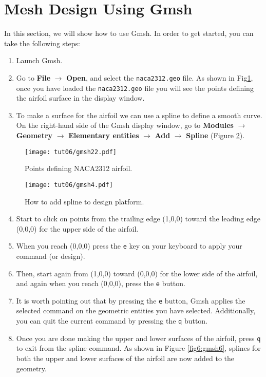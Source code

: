 \section{Mesh Design Using Gmsh}
In this section, we will show how to use Gmsh. In order to get started, you can take the following steps:
\begin{enumerate}[label=\arabic*)]
	\setcounter{enumi}{0}
	\item Launch Gmsh.
	\item Go to \textbf{File} $\rightarrow$ \textbf{Open}, and select the \texttt{naca2312.geo} file. As shown in Fig\ref{fig6:gmsh22}, once you have loaded the \texttt{naca2312.geo} file you will see the points defining the airfoil surface in the display window.	
	\item To make a surface for the airfoil we can use a spline to define a smooth curve. On the right-hand side of the Gmsh display window, go to \textbf{Modules} $\rightarrow$ \textbf{Geometry} $\rightarrow$ \textbf{Elementary entities} $\rightarrow$ \textbf{Add} $\rightarrow$ \textbf{Spline} (Figure \ref{fig6:gmsh4}).
\end{enumerate}
\begin{figure}[ht]
    \centering
    \texttt{[image: tut06/gmsh22.pdf]}
    \caption{Points defining NACA2312 airfoil.}
    \label{fig6:gmsh22}
\end{figure}
\begin{figure}[ht]
    \centering
    \texttt{[image: tut06/gmsh4.pdf]}
    \caption{How to add spline to design platform.}
    \label{fig6:gmsh4}
\end{figure}
\begin{enumerate}[label=\arabic*)]
	\setcounter{enumi}{3}
	\item Start to click on points from the trailing edge (1,0,0) toward the leading edge (0,0,0) for the upper side of the airfoil.
	\item When you reach (0,0,0) press the \texttt{e} key on your keyboard to apply your command (or design).
	\item Then, start again from (1,0,0) toward (0,0,0) for the lower side of the airfoil, and again when you reach (0,0,0), press the \texttt{e} button.
	\item It is worth pointing out that by pressing the \texttt{e} button, Gmsh applies the selected command on the geometric entities you have selected. Additionally, you can quit the current command by pressing the \texttt{q} button.
	\item Once you are done making the upper and lower surfaces of the airfoil, press \texttt{q} to exit from the spline command. As shown in Figure \ref{fig6:gmsh6}, splines for both the upper and lower surfaces of the airfoil are now added to the geometry.	
\end{enumerate}

